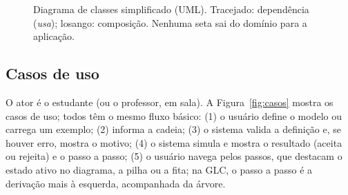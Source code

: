 \documentclass[12pt,a4paper]{article}
\begin{document}
\begin{figure}[htbp]
  \caption{Diagrama de classes simplificado (UML). Tracejado: dependência
    (\emph{usa}); losango: composição. Nenhuma seta sai do domínio para a
    aplicação.}
  \label{fig:classes}
\end{figure}

\subsection{Casos de uso}

O ator é o estudante (ou o professor, em sala). A Figura~\ref{fig:casos}
mostra os casos de uso; todos têm o mesmo fluxo básico: (1) o usuário define o
modelo ou carrega um exemplo; (2) informa a cadeia; (3) o sistema valida a
definição e, se houver erro, mostra o motivo; (4) o sistema simula e mostra o
resultado (aceita ou rejeita) e o passo a passo; (5) o usuário navega pelos
passos, que destacam o estado ativo no diagrama, a pilha ou a fita; na GLC, o
passo a passo é a derivação mais à esquerda, acompanhada da árvore.
\end{document}
